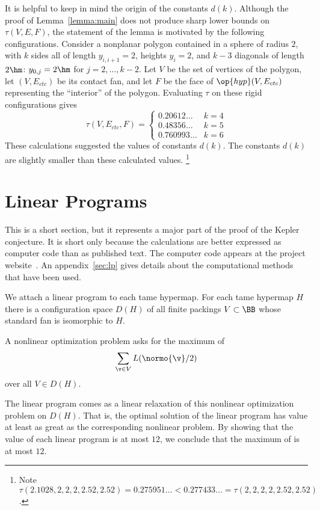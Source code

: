 \begin{remark}
  It is helpful to keep in mind the origin of the constants $d(k)$.
  Although the proof of Lemma~\ref{lemma:main} does not produce sharp
  lower bounds on $\tau(V,E,F)$, the statement of the lemma is
  motivated by the following configurations.  Consider a nonplanar
  polygon contained in a sphere of radius $2$, with $k$ sides all of
  length $y_{i,i+1}=2$, heights $y_i=2$, and $k-3$ diagonals of length
  $2\hm$: $y_{0,j}=2\hm$ for $j=2,\ldots,k-2$.  Let $V$ be the set of
  vertices of the polygon, let $(V,E_{ctc})$ be its contact fan, and
  let $F$ be the face of $\op{hyp}(V,E_{ctc})$ representing the
  ``interior'' of the polygon.  Evaluating $\tau$ on these rigid
  configurations gives
\[ 
\tau(V,E_{ctc},F) = 
\begin{cases}
0.20612\ldots & k=4\\
0.48356\ldots & k=5\\
0.760993\ldots &k=6
\end{cases}
\] 
These calculations suggested the values of constants $d(k)$.  The
constants $d(k)$ are slightly smaller than these calculated values.%
\footnote{Note $\tau(2.1028,2,2,2,2.52,2.52) = 0.275951\ldots <
  0.277433\ldots = \tau(2,2,2,2,2.52,2.52)$.}  %
%
%
\end{remark}


\section{Linear Programs}

This is a short section, but it represents a major part of the proof
of the Kepler conjecture.  It is short only because the calculations
are better expressed as computer code than as published text.  The
computer code appears at the project
website~\cite{website:FlyspeckProject}.  An appendix~\ref{sec:lp} gives
details about the computational methods that have been used.

We attach a linear program to each tame hypermap.
For each tame hypermap $H$ there is a configuration space $D(H)$ of all
finite packings $V\subset \BB$ whose standard fan is
isomorphic to $H$.
%
%

A nonlinear optimization problem asks for the maximum of
\begin{equation}\label{eqn:L2}
\sum_{\v\in V} L(\normo{\v}/2)
\end{equation}
over all $V\in D(H)$.

The linear program comes as a linear relaxation of this nonlinear
optimization problem on $D(H)$. That is, the optimal solution of the linear program has value at least as great as the corresponding
nonlinear problem.  By showing that the value of each linear program
is at most $12$, we conclude that the maximum of 
is at most $12$.




